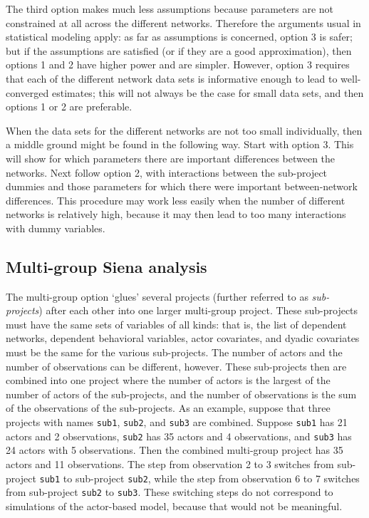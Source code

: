 \documentclass[a4paper,fleqn]{article}
\newcommand{\+}{\, + \,}
\begin{document}
{The third option makes much less assumptions because parameters are not
constrained at all across the different networks.
Therefore the arguments usual in statistical modeling apply:
as far as assumptions is concerned, option 3 is safer;
but if the assumptions are satisfied (or if they are a good approximation),
then options 1 and 2 have higher power and are simpler.
However, option 3 requires that each of the different network data sets
is informative enough to lead to well-converged estimates;
this will not always be the case for small data sets,
and then options 1 or 2 are preferable.

When the data sets for the different networks are not too small
individually,
then a middle ground might be found in the following way.
Start with option 3. This will show for which parameters there are
important differences between the networks.
Next follow option 2, with interactions between the sub-project dummies
and those parameters for which there were important between-network
differences.
This procedure may work less easily when
the number of different networks is relatively high, because it may
then lead to too many interactions with dummy variables.

\subsection{Multi-group Siena analysis}
\label{S_multigroup}

The multi-group option `glues' several projects
(further referred to as \emph{sub-projects}) after each other
into one larger multi-group project.
These sub-projects
must have the same sets of variables of all kinds:
that is, the list of dependent networks, dependent behavioral variables,
actor covariates, and dyadic covariates must be the same
for the various sub-projects. The number of actors
and the number of observations can be different, however.
These sub-projects then are combined into one project
where the number of actors is the largest of the number of
actors of the sub-projects, and the number of observations
is the sum of the observations of the sub-projects.
As an example, suppose that three projects with names {\tt sub1}, {\tt sub2}, and
{\tt sub3} are combined. Suppose {\tt sub1} has 21 actors and
2 observations, {\tt sub2} has 35 actors and 4 observations,
and {\tt sub3} has 24 actors with 5 observations.
Then the combined multi-group project has 35 actors and 11 observations.
The step from observation 2 to 3 switches from sub-project {\tt sub1}
to sub-project {\tt sub2}, while
the step from observation 6 to 7 switches from sub-project {\tt sub2}
to {\tt sub3}. These switching steps do not correspond to simulations
of the actor-based model, because that would not be meaningful.

}
\end{document}

